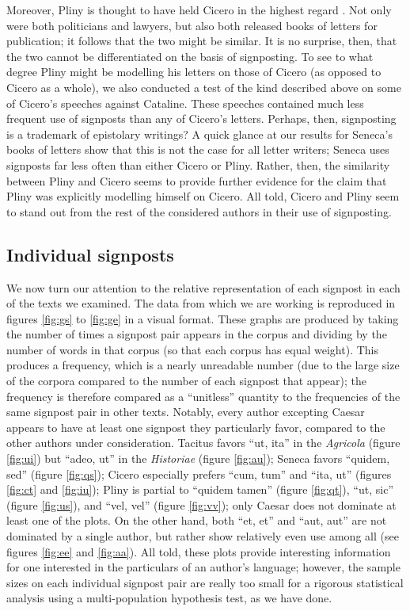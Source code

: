 Moreover, Pliny is thought to have held Cicero in the highest regard \cite{plinycicero2} \cite{plinycicero1}. Not only were both politicians and lawyers, but also both released books of letters for publication; it follows that the two might be similar. It is no surprise, then, that the two cannot be differentiated on the basis of signposting. To see to what degree Pliny might be modelling his letters on those of Cicero (as opposed to Cicero as a whole), we also conducted a test of the kind described above on some of Cicero's speeches against Cataline. These speeches contained much less frequent use of signposts than any of Cicero's letters. Perhaps, then, signposting is a trademark of epistolary writings? A quick glance at our results for Seneca's books of letters show that this is not the case for all letter writers; Seneca uses signposts far less often than either Cicero or Pliny. Rather, then, the similarity between Pliny and Cicero seems to provide further evidence for the claim that Pliny was explicitly modelling himself on Cicero. All told, Cicero and Pliny seem to stand out from the rest of the considered authors in their use of signposting.

\subsection{Individual signposts}
\label{sec:plots}

We now turn our attention to the relative representation of each signpost in each of the texts we examined. The data from which we are working is reproduced in figures \ref{fig:gs} to \ref{fig:ge} in a visual format. These graphs are produced by taking the number of times a signpost pair appears in the corpus and dividing by the number of words in that corpus (so that each corpus has equal weight). This produces a frequency, which is a nearly unreadable number (due to the large size of the corpora compared to the number of each signpost that appear); the frequency is therefore compared as a ``unitless'' quantity to the frequencies of the same signpost pair in other texts. Notably, every author excepting Caesar appears to have at least one signpost they particularly favor, compared to the other authors under consideration. Tacitus favors ``ut, ita'' in the \textit{Agricola} (figure \ref{fig:ui}) but ``adeo, ut'' in the \textit{Historiae} (figure \ref{fig:au}); Seneca favors ``quidem, sed'' (figure \ref{fig:qs}); Cicero especially prefers ``cum, tum'' and ``ita, ut'' (figures \ref{fig:ct} and \ref{fig:iu}); Pliny is partial to ``quidem tamen'' (figure \ref{fig:qt}), ``ut, sic'' (figure \ref{fig:us}), and ``vel, vel'' (figure \ref{fig:vv}); only Caesar does not dominate at least one of the plots. On the other hand, both ``et, et'' and ``aut, aut'' are not dominated by a single author, but rather show relatively even use among all (see figures \ref{fig:ee} and \ref{fig:aa}). All told, these plots provide interesting information for one interested in the particulars of an author's language; however, the sample sizes on each individual signpost pair are really too small for a rigorous statistical analysis using a multi-population hypothesis test, as we have done.  

